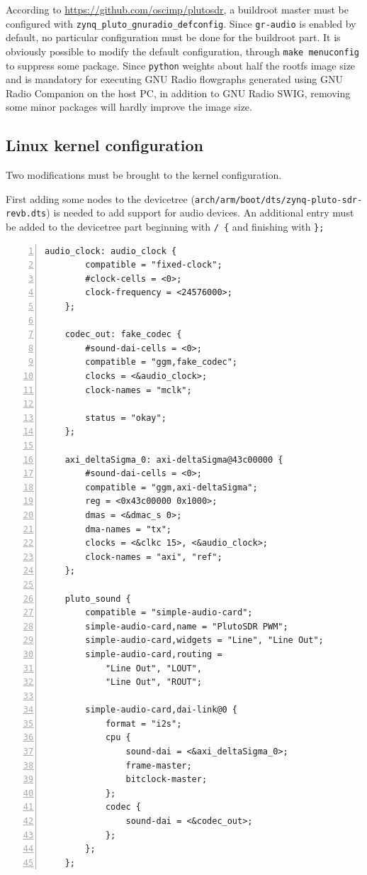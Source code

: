 \documentclass[12pt,oneside]{article}
\begin{document}
According to \url{https://github.com/oscimp/plutosdr}, a buildroot master must
be configured with {\tt zynq\_pluto\_gnuradio\_defconfig}. Since {\tt gr-audio} is
enabled by default, no particular configuration must be done for the buildroot part. 
It is obviously possible to modify the default configuration, through {\tt make
menuconfig} to suppress some package. Since {\tt python} weights about half the
rootfs image size and is mandatory for executing GNU Radio flowgraphs generated using
GNU Radio Companion on the host PC, in addition to GNU Radio SWIG, removing some minor
packages will hardly improve the image size.

\subsection{Linux kernel configuration}

Two modifications must be brought to the kernel configuration. 

First adding some nodes to the devicetree 
({\tt arch/arm/boot/dts/zynq-pluto-sdr-revb.dts}) is needed to add support 
for audio devices. An additional entry must be added to the devicetree part
beginning with \verb|/ {| and finishing with \verb|};|
\begin{lstlisting}[numbers=left]
    audio_clock: audio_clock {
        compatible = "fixed-clock";
        #clock-cells = <0>;
        clock-frequency = <24576000>;
    };

    codec_out: fake_codec {
        #sound-dai-cells = <0>;
        compatible = "ggm,fake_codec";
        clocks = <&audio_clock>;
        clock-names = "mclk";

        status = "okay";
    };

    axi_deltaSigma_0: axi-deltaSigma@43c00000 {
        #sound-dai-cells = <0>;
        compatible = "ggm,axi-deltaSigma";
        reg = <0x43c00000 0x1000>;
        dmas = <&dmac_s 0>;
        dma-names = "tx";
        clocks = <&clkc 15>, <&audio_clock>;
        clock-names = "axi", "ref";
    };

    pluto_sound {
        compatible = "simple-audio-card";
        simple-audio-card,name = "PlutoSDR PWM";
        simple-audio-card,widgets = "Line", "Line Out";
        simple-audio-card,routing = 
            "Line Out", "LOUT",
            "Line Out", "ROUT";

        simple-audio-card,dai-link@0 {
            format = "i2s";
            cpu {
                sound-dai = <&axi_deltaSigma_0>;
                frame-master;
                bitclock-master;
            };
            codec {
                sound-dai = <&codec_out>;
            };
        };
    };
\end{lstlisting}
\end{document}
